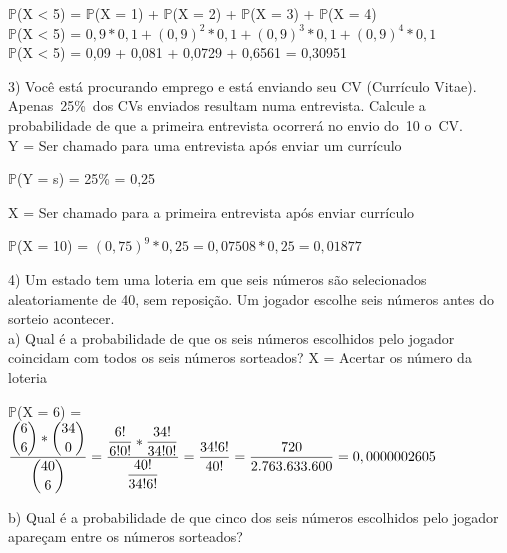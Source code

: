 \documentclass[12pt,a4paper,draft]{article}
\begin{document}
	\begin{center}
		\vspace{0.5cm}
		$\mathbb{P}$(X < 5) = $\mathbb{P}$(X = 1) + $\mathbb{P}$(X = 2) + $\mathbb{P}$(X = 3) + $\mathbb{P}$(X = 4)
		\vspace{0.5cm}\\
		$\mathbb{P}$(X < 5) = $0,9 * 0,1 + \left(0,9\right)^2 * 0,1 + \left(0,9\right)^3 * 0,1 + \left(0,9\right)^4 * 0,1$ 
		\vspace{0.5cm}\\
		$\mathbb{P}$(X < 5) = 0,09 + 0,081 + 0,0729 + 0,6561 = 0,30951
	\end{center}
\vspace{1cm}
	3) Você está procurando emprego e está enviando seu CV (Currículo Vitae).	Apenas 25\% dos CVs enviados resultam numa entrevista. Calcule a probabilidade de que a primeira entrevista ocorrerá no envio do 10 o CV.
	\vspace{0.5cm}\\
	Y = Ser chamado para uma entrevista após enviar um currículo
	\begin{center}
		\vspace{0.5cm}
		$\mathbb{P}$(Y = s) = 25\% = 0,25
	\end{center}
	\vspace{1cm}
	X = Ser chamado para a primeira entrevista após enviar currículo
	\begin{center}
		\vspace{0.5cm}
		$\mathbb{P}$(X = 10) = $\left(0,75\right)^9 * 0,25 = 0,07508 * 0,25 = 0,01877$ 
	\end{center}
	\vspace{1cm}
	4) Um estado tem uma loteria em que seis números são selecionados
	aleatoriamente de 40, sem reposição. Um jogador escolhe seis números antes do sorteio acontecer.\\
	a) Qual é a probabilidade de que os seis números escolhidos pelo jogador coincidam com todos os seis números sorteados?
	\vspace{0.5cm}
	X = Acertar os número da loteria
	\begin{center}
		\vspace{0.5cm}
		$\mathbb{P}$(X = 6) = $\dfrac{\dbinom{6}{6} * \dbinom{34}{0}}{\dbinom{40}{6}} = \dfrac{\dfrac{6!}{6!0!} * \dfrac{34!}{34!0!}}{\dfrac{40!}{34! 6!}} = \dfrac{34!6!}{40!} = \dfrac{720}{2.763.633.600} = 0,0000002605$
	\end{center}
	\vspace{1cm}
	b) Qual é a probabilidade de que cinco dos seis números escolhidos pelo jogador apareçam entre os números sorteados?
\end{document}
